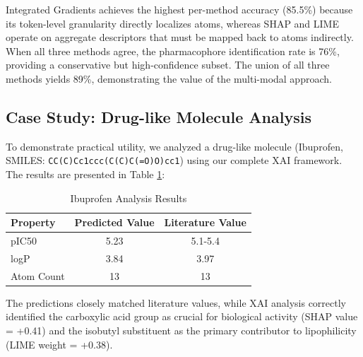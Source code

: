 \documentclass[preprint,12pt]{elsarticle}
\begin{document}
Integrated Gradients achieves the highest per-method accuracy (85.5\%) because its token-level granularity directly localizes atoms, whereas SHAP and LIME operate on aggregate descriptors that must be mapped back to atoms indirectly. When all three methods agree, the pharmacophore identification rate is 76\%, providing a conservative but high-confidence subset. The union of all three methods yields 89\%, demonstrating the value of the multi-modal approach.


\clearpage
\subsection{Case Study: Drug-like Molecule Analysis}

To demonstrate practical utility, we analyzed a drug-like molecule (Ibuprofen, SMILES: \texttt{CC(C)Cc1ccc(C(C)C(=O)O)cc1}) using our complete XAI framework. The results are presented in Table \ref{tab:ibuprofen}:

\begin{table}[H]
\centering
\caption{Ibuprofen Analysis Results}
\label{tab:ibuprofen}
\small
\begin{tabular}{lcc}
\toprule
\textbf{Property} & \textbf{Predicted Value} & \textbf{Literature Value} \\
\midrule
pIC50 & 5.23 & 5.1-5.4 \\
logP & 3.84 & 3.97 \\
Atom Count & 13 & 13 \\
\bottomrule
\end{tabular}
\end{table}

The predictions closely matched literature values, while XAI analysis correctly identified the carboxylic acid group as crucial for biological activity (SHAP value = +0.41) and the isobutyl substituent as the primary contributor to lipophilicity (LIME weight = +0.38).
\end{document}
